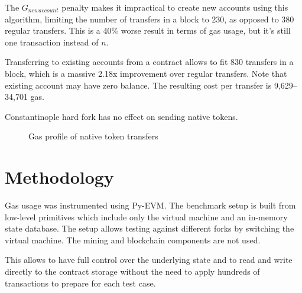 \documentclass[12pt]{article}
\begin{document}
The $G_{newaccount}$ penalty makes it impractical to create new accounts using this algorithm, limiting the number of transfers in a block to 230, as opposed to 380 regular transfers.
This is a 40\% worse result in terms of gas usage, but it's still one transaction instead of $n$.

Transferring to existing accounts from a contract allows to fit 830 transfers in a block, which is a massive 2.18x improvement over regular transfers.
Note that existing account may have zero balance.
The resulting cost per transfer is 9,629--34,701 gas.

Constantinople hard fork has no effect on sending native tokens.

\begin{figure}[h!]
\caption{Gas profile of native token transfers}
\end{figure}


\section{Methodology}

Gas usage was instrumented using Py-EVM\cite{pyevm}.
The benchmark setup is built from low-level primitives which include only the virtual machine and an in-memory state database.
The setup allows testing against different forks by switching the virtual machine.
The mining and blockchain components are not used.

This allows to have full control over the underlying state and to read and write directly to the contract storage without the need to apply hundreds of transactions to prepare for each test case.
\end{document}
